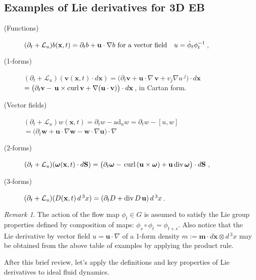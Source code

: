\documentclass[11pt, oneside]{article}   	%
\numberwithin{equation}{section}
\theoremstyle{plain}
\theoremstyle{definition}
\theoremstyle{remark}
\newtheorem{remark}[theorem]{Remark}
\newcommand{\<}{\langle}
\renewcommand{\>}{\rangle}
\begin{document}
\subsection{Examples of Lie derivatives for 3D EB} \label{examp: LieDeriv}%
\begin{description} 

\item [(Functions)]
$(\partial_t + \mathcal{L}_u)b(\mathbf{x},t)
=
\partial_t b + \mathbf{u}\cdot \nabla b \hbox{ for a vector field} \quad u=\dot{\phi}_t \phi_t^{-1}
$\,, 

\item [(1-forms)]
$(\partial_t + \mathcal{L}_u)( \mathbf{v}(\mathbf{x},t)\cdot d\mathbf{x})
= \big(\partial_t\mathbf{v}+ \mathbf{u}\cdot\nabla \,\mathbf{v} + v_j\nabla u\,^j\big)\cdot d\mathbf{x}$
\\ 
\hspace{1.82cm}$=\big(\partial_t\mathbf{v} 
-\,\mathbf{u}\times{\rm curl}\,\mathbf{v} + \nabla(\mathbf{u}\cdot\mathbf{v})\big)\cdot d\mathbf{x} 
$\,,  in Cartan form.
\smallskip

\item [(Vector fields)] 
$(\partial_t + \mathcal{L}_u) w(\mathbf{x},t)
=
\partial_t w - \mathrm{ad}_uw = \partial_t w - [u, w ] $\\
$= \big(\partial_t \mathbf{w} + \mathbf{u}\cdot\nabla \mathbf{w} - \mathbf{w}\cdot\nabla \mathbf{u} \big)\cdot\nabla$
\smallskip

\item [(2-forms)]
$(\partial_t + \mathcal{L}_u)({\boldsymbol{\omega}}(\mathbf{x},t)\cdot d\mathbf{S})
=
\big(\partial_t{\boldsymbol{\omega}} -\,{\rm curl}\,(\mathbf{u} \times
{\boldsymbol{\omega}} )
+
\mathbf{u}\,{\rm div}\,{\boldsymbol{\omega}}\big)\cdot d\mathbf{S}$\,,
\smallskip

\item [(3-forms)]
$(\partial_t + \mathcal{L}_u)(D(\mathbf{x},t)\, d\,^3x)
=
(\partial_tD + {\rm div}\,D\,\mathbf{u})\, d\,^3x$\,.
\end{description}
\begin{remark}
The action of the flow map $\phi_t\in G$ is assumed to satisfy the Lie group properties defined by composition
of maps: $\phi_s\circ \phi_t = \phi_{t+s}$. Also notice that the Lie derivative by vector field  $u=\mathbf{u}\cdot\nabla$ of a 1-form density 
$m:=\mathbf{m} \cdot d\mathbf{x} \otimes d\,^3x$ may be obtained from the above table of examples by applying the product rule.
\end{remark}
After this brief review, let's apply the definitions and key properties of Lie derivatives to ideal fluid dynamics. 
\end{document}
